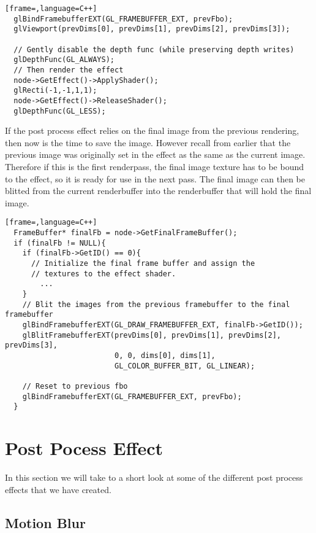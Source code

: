 \begin{lstlisting}[frame=,language=C++]
  glBindFramebufferEXT(GL_FRAMEBUFFER_EXT, prevFbo);
  glViewport(prevDims[0], prevDims[1], prevDims[2], prevDims[3]);
  
  // Gently disable the depth func (while preserving depth writes)
  glDepthFunc(GL_ALWAYS);
  // Then render the effect
  node->GetEffect()->ApplyShader();
  glRecti(-1,-1,1,1);
  node->GetEffect()->ReleaseShader();
  glDepthFunc(GL_LESS);
\end{lstlisting}


If the post process effect relies on the final image from the previous
rendering, then now is the time to save the image. However recall from
earlier that the previous image was originally set in the effect as
the same as the current image. Therefore if this is the first
renderpass, the final image texture has to be bound to the effect, so
it is ready for use in the next pass. The final image can then be
blitted from the current renderbuffer into the renderbuffer that will
hold the final image.

\begin{lstlisting}[frame=,language=C++]
  FrameBuffer* finalFb = node->GetFinalFrameBuffer();
  if (finalFb != NULL){
    if (finalFb->GetID() == 0){
      // Initialize the final frame buffer and assign the
      // textures to the effect shader.
        ...
    }
    // Blit the images from the previous framebuffer to the final framebuffer
    glBindFramebufferEXT(GL_DRAW_FRAMEBUFFER_EXT, finalFb->GetID());
    glBlitFramebufferEXT(prevDims[0], prevDims[1], prevDims[2], prevDims[3], 
                         0, 0, dims[0], dims[1], 
                         GL_COLOR_BUFFER_BIT, GL_LINEAR);
    
    // Reset to previous fbo
    glBindFramebufferEXT(GL_FRAMEBUFFER_EXT, prevFbo);
  }
\end{lstlisting}

\section{Post Pocess Effect}

In this section we will take to a short look at some of the different
post process effects that we have created.

\subsection{Motion Blur}

